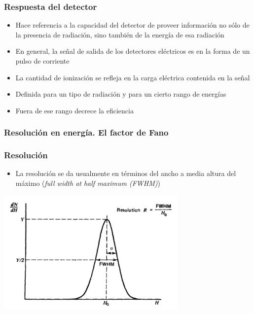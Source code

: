 \documentclass{beamer}
\begin{document}
\begin{frame}
\frametitle{Respuesta del detector}
\begin{exampleblock}{}
\begin{itemize}
\item Hace referencia a la capacidad del detector de proveer información no sólo
de la presencia de radiación, sino también de la energía de esa radiación 
\item En general, la señal de salida de los detectores eléctricos es en la forma
de un pulso de corriente 
\item La cantidad de ionización se refleja en la carga eléctrica contenida en la
señal
\end{itemize}
\end{exampleblock}
\begin{alertblock}{}
\begin{itemize}
\item Definida para un tipo de radiación y para un cierto rango de
energías 
\item Fuera de ese rango decrece la eficiencia
\end{itemize}
\end{alertblock}
\end{frame} 

\subsubsection{Resolución en energía. El factor de Fano}

\begin{frame}
\frametitle{Resolución}
\begin{alertblock}{}
\begin{itemize}
\item La resolución se da usualmente en términos del \alert{ancho a media altura del
máximo (\textit{full width at half maximum (FWHM)}}) 
\end{itemize}
\end{alertblock}
\begin{center}
\includegraphics[width=0.7\textwidth]{d1/det_resolution_definition}
\end{center}
\end{frame} 
\end{document}
